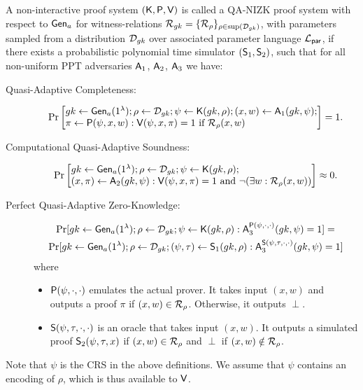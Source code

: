 \begin{definition}
A non-interactive proof system  $(\mathsf{K},\mathsf{P},\mathsf{V})$ is called a QA-NIZK proof system with respect to $\mathsf{Gen}_a$ for witness-relations
$\mathcal{R}_{gk} = \{\mathcal{R}_\rho\}_{\rho \in \mathrm{sup}(\mathcal{D}_{gk})}$,
with parameters sampled from a distribution $\mathcal{D}_{gk}$ over associated parameter language
$\mathcal{L}_\mathsf{par}$, if there exists a probabilistic polynomial time simulator $(\mathsf{S}_1, \mathsf{S}_2)$,
such that for all non-uniform PPT adversaries $\mathsf{A}_1$, $\mathsf{A}_2$, $\mathsf{A}_3$ we have:

\begin{description}
\item[Quasi-Adaptive Completeness:]
$$\Pr\begin{bmatrix*}[l]
    \gk \gets \G_a(1^\lambda);
    \rho \gets \dist_\gk;
    \psi \gets \algK(\gk, \rho);
    (x, w) \gets \advA_1(\gk, \psi);\\
    \pi \gets \algP(\psi, x, w) :
        \algV(\psi, x, \pi) = 1 \text{ if } \R_\rho(x, w)
\end{bmatrix*} = 1.$$
\item[Computational Quasi-Adaptive Soundness:]
$$\Pr\begin{bmatrix*}[l]
    \gk \gets \G_a(1^\lambda);
    \rho \gets \dist_\gk;
    \psi \gets \algK(\gk, \rho); \\
    (x, \pi) \gets \advA_2(\gk, \psi) :
        \algV(\psi, x, \pi) = 1 \text{ and } \neg (\exists w : \R_\rho(x, w))
\end{bmatrix*} \approx 0.$$ 
\item[Perfect Quasi-Adaptive Zero-Knowledge:]
\begin{eqnarray*}
\Pr[
    {gk} \gets \mathsf{Gen}_a(1^\lambda);
    \rho \gets \mathcal{D}_{gk};
    \psi \gets \mathsf{K}({gk}, \rho):
        \mathsf{A}_3^{\mathsf{P}(\psi,\cdot, \cdot)}({gk},\psi) = 1]
=\;\;\;\\
\Pr[
    {gk} \gets \mathsf{Gen}_a(1^\lambda);
    \rho \gets \mathcal{D}_{gk};
    (\psi,\tau) \gets \mathsf{S}_1({gk}, \rho):
        \mathsf{A}_3^{\mathsf{S}(\psi,\tau,\cdot,\cdot)}({gk},\psi)=1]
\end{eqnarray*}
where
\begin{itemize}
\item $\mathsf{P}(\psi, \cdot, \cdot)$ emulates the actual prover. It takes input $(x,w)$ and outputs a 
proof $\pi$ if $(x,w)\in\mathcal{R}_\rho$. Otherwise, it outputs $\perp$.
\item $\mathsf{S}(\psi,\tau, \cdot, \cdot)$ is an oracle that takes input $(x,w)$. It outputs a simulated proof
$\mathsf{S}_2(\psi,\tau, x)$ if $(x, w) \in \mathcal{R}_\rho$ and $\perp$ if $(x, w) \notin \mathcal{R}_\rho$.
\end{itemize}
\end{description}
Note that $\psi$ is the CRS in the above definitions.
We assume that $\psi$ contains an encoding of $\rho$, which is thus available to $\mathsf{V}$.
\end{definition}

